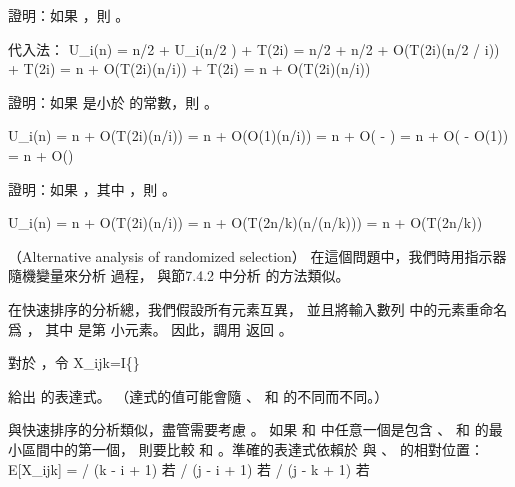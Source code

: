 \startitem
證明：如果 ，則 。
\stopitem

\startANSWER
代入法：
\startformula\startmathalignment
\NC U_i(n)
    \NC = \lfloor n/2 \rfloor + U_i(\lceil n/2 \rceil) + T(2i) \NR
\NC \NC = \lfloor n/2 \rfloor + \lceil n/2 \rceil +
             O(T(2i)\lg(\lfloor n/2 \rfloor / i)) + T(2i) \NR
\NC \NC = n + O(T(2i)\lg(n/i)) + T(2i) \NR
\NC \NC = n + O(T(2i)\lg(n/i)) \NR
\stopmathalignment\stopformula
\stopANSWER

\startitem
證明：如果  是小於  的常數，則 。
\stopitem

\startANSWER
\startformula\startmathalignment
\NC U_i(n)
    \NC = n + O(T(2i)\lg(n/i)) \NR
\NC \NC = n + O(O(1)\lg(n/i)) \NR
\NC \NC = n + O( - ) \NR
\NC \NC = n + O( - O(1)) \NR
\NC \NC = n + O() \NR
\stopmathalignment\stopformula
\stopANSWER

\startitem
證明：如果 ，其中 ，則 。
\stopitem

\startANSWER
\startformula\startmathalignment
\NC U_i(n)
    \NC = n + O(T(2i)\lg(n/i)) \NR
\NC \NC = n + O(T(2n/k)\lg(n/(n/k))) \NR
\NC \NC = n + O(T(2n/k)) \NR
\stopmathalignment\stopformula
\stopANSWER
\stopigBase
\stopPROBLEM

\startPROBLEM
（Alternative analysis of randomized selection）
在這個問題中，我們時用指示器隨機變量來分析  過程，
與節7.4.2 中分析  的方法類似。

在快速排序的分析總，我們假設所有元素互異，
並且將輸入數列  中的元素重命名爲 ，
其中  是第  小元素。
因此，調用  返回 。

對於 ，令
\startformula
X_{ijk}=I\{\}
\stopformula

\startigBase[a]
\startitem
給出  的表達式。
（\hint 達式的值可能會隨 、  和  的不同而不同。）
\stopitem

\startANSWER
與快速排序的分析類似，盡管需要考慮 。
如果  和  中任意一個是包含 、  和  的最小區間中的第一個，
則要比較  和 。準確的表達式依賴於  與 、  的相對位置：
\startformula
E[X_{ijk}] = \startmathcases
{} / (k - i + 1) \NC 若  \NR
{} / (j - i + 1) \NC 若  \NR
{} / (j - k + 1) \NC 若  \NR
\stopmathcases
\stopformula
\stopANSWER

